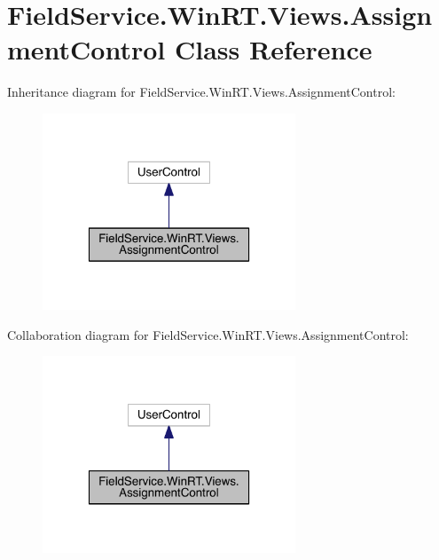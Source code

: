 \hypertarget{class_field_service_1_1_win_r_t_1_1_views_1_1_assignment_control}{\section{Field\+Service.\+Win\+R\+T.\+Views.\+Assignment\+Control Class Reference}
\label{class_field_service_1_1_win_r_t_1_1_views_1_1_assignment_control}
}


Inheritance diagram for Field\+Service.\+Win\+R\+T.\+Views.\+Assignment\+Control\+:
\nopagebreak
\begin{figure}[H]
\begin{center}
\leavevmode
\includegraphics[width=214pt]{class_field_service_1_1_win_r_t_1_1_views_1_1_assignment_control__inherit__graph}
\end{center}
\end{figure}


Collaboration diagram for Field\+Service.\+Win\+R\+T.\+Views.\+Assignment\+Control\+:
\nopagebreak
\begin{figure}[H]
\begin{center}
\leavevmode
\includegraphics[width=214pt]{class_field_service_1_1_win_r_t_1_1_views_1_1_assignment_control__coll__graph}
\end{center}
\end{figure}
